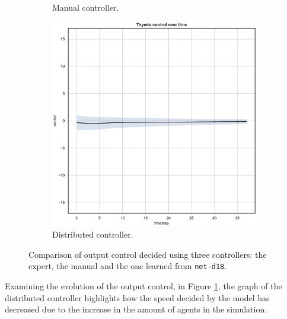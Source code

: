 \begin{figure}[!htb]
\begin{subfigure}[h]{0.3\textwidth}
		\caption{Manual controller.}
	\end{subfigure}
	\hfill
	\begin{subfigure}[h]{0.3\textwidth}
		\centering
		\includegraphics[width=\textwidth]{contents/images/net-d18/control-overtime-learned_distributed}
		\caption{Distributed controller.}
	\end{subfigure}
	\caption[Evaluation of the control decided by \texttt{net-d18}.]{Comparison 
		of output control decided using three controllers: the expert, the manual and 
		the one learned from \texttt{net-d18}.}
	\label{fig:net-d18control}
\end{figure}
Examining the evolution of the output control, in Figure \ref{fig:net-d18control}, 
the graph of the distributed controller highlights how the speed decided by the 
model has decreased due to the increase in the amount of agents in the 
simulation.

